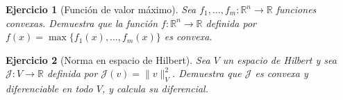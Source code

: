 \documentclass[11pt]{report}
\newtheorem{ex}{Ejercicio}
\newenvironment{solucion}{\color{blue}\textbf{Solución:}}{}
\begin{document}


\begin{ex}[Función de valor máximo]
    Sea $f_1, \dots, f_m: \mathbb{R}^n \to \mathbb{R}$ funciones convexas. Demuestra que la función $f: \mathbb{R}^n \to \mathbb{R}$ definida por $f(x) = \max\{f_1(x), \dots, f_m(x)\}$ es convexa.
\end{ex}



\begin{ex}[Norma en espacio de Hilbert]
    Sea $V$ un espacio de Hilbert y sea $\mathcal{J}: V \to \mathbb{R}$ definida por $\mathcal{J}(v) = \|v\|_V^2$. Demuestra que $\mathcal{J}$ es convexa y diferenciable en todo $V$, y calcula su diferencial.
\end{ex}
\end{document}
